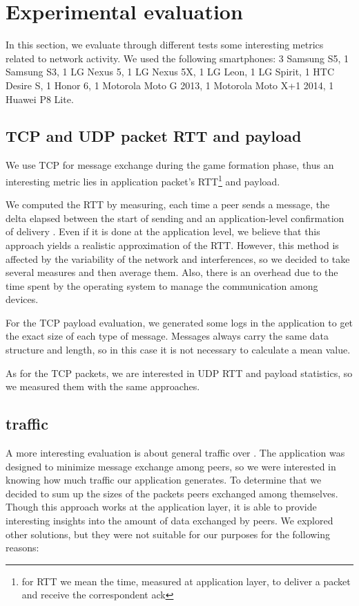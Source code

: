\section{Experimental evaluation}

In this section, we evaluate through different tests some interesting metrics
related to network activity. We used the following smartphones: 3 Samsung S5,
1 Samsung S3, 1 LG Nexus 5, 1 LG Nexus 5X, 1 LG Leon, 1 LG Spirit, 1 HTC Desire
S, 1 Honor 6, 1 Motorola Moto G 2013, 1 Motorola Moto X+1 2014, 1 Huawei P8
Lite.

\subsection{TCP and UDP packet RTT and payload}\label{sec:eval-rtt}
We use TCP for message exchange during the game formation phase, thus an interesting metric lies in application packet's RTT\footnote{for RTT we mean the time, measured at application layer, to deliver a packet and receive the correspondent ack} and payload.

We computed the RTT by measuring, each time a peer sends a message, the delta
elapsed between the start of sending and an application-level confirmation of
delivery . Even if it is done at the application level, we believe that this
approach yields a realistic approximation of the RTT.
However, this method is affected by the variability of the network and
interferences, so we decided to take several measures and then average them.
Also, there is an overhead due to the time spent by the operating system to
manage the communication among devices.

For the TCP payload evaluation, we generated some logs in the application to get the exact size of each type of message. Messages always carry the same data structure and length, so in this case it is not necessary to calculate a mean value.

As for the TCP packets, we are interested in UDP RTT and payload statistics, so we measured them with the same approaches.

\subsection{\wifi{} traffic}

A more interesting evaluation is about general traffic over \wifi. The
application was designed to minimize message exchange among peers, so we were
interested in knowing how much traffic our application generates. To determine
that we decided to sum up the sizes of the packets peers exchanged among
themselves.
Though this approach works at the application layer, it is able to provide
interesting insights into the amount of data exchanged by peers. We explored
other solutions, but they were not suitable for our purposes for the following
reasons:

